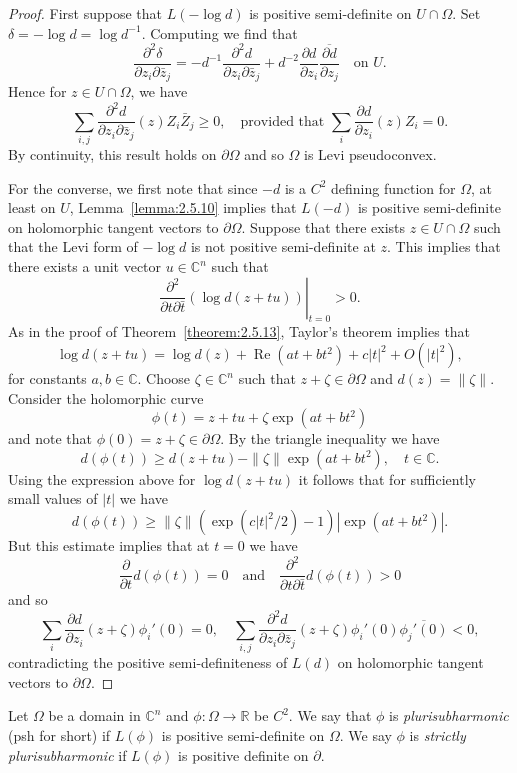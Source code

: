 \begin{proof}
First suppose that $L(-\log d)$ is positive semi-definite on $U\cap\Omega$. Set $\delta=-\log d=\log d^{-1}$. Computing we find that
\[\frac{\partial^2\delta}{\partial z_i\partial\bar z_j}=-d^{-1}\frac{\partial^2d}{\partial z_i\partial\bar z_j}+d^{-2}\frac{\partial d}{\partial z_i}\overline{\frac{\partial d}{\partial z_j}}\quad\text{on }U.\]
Hence for $z\in U\cap\Omega$, we have
\[\sum_{i,j}\frac{\partial^2d}{\partial z_i\partial\bar z_j}(z)Z_i\bar Z_j\geq0,\quad\text{provided that }\sum_i\frac{\partial d}{\partial z_i}(z)Z_i=0.\]
By continuity, this result holds on $\partial\Omega$ and so $\Omega$ is Levi pseudoconvex.

For the converse, we first note that since $-d$ is a $C^2$ defining function for $\Omega$, at least on $U$, Lemma~\ref{lemma:2.5.10} implies that $L(-d)$ is positive semi-definite on holomorphic tangent vectors to $\partial\Omega$. Suppose that there exists $z\in U\cap\Omega$ such that the Levi form of $-\log d$ is not positive semi-definite at $z$. This implies that there exists a unit vector $u\in\mathbb C^n$ such that
\[\left.\frac{\partial^2}{\partial t\partial\bar t}(\log d(z+tu))\right|_{t=0}>0.\]
As in the proof of Theorem~\ref{theorem:2.5.13}, Taylor's theorem implies that
\[\log d(z+tu)=\log d(z)+\operatorname{Re}(at+bt^2)+c|t|^2+O(|t|^2),\]
for constants $a,b\in\mathbb C$. Choose $\zeta\in\mathbb C^n$ such that $z+\zeta\in\partial\Omega$ and $d(z)=\|\zeta\|$. Consider the holomorphic curve
\[\phi(t)=z+tu+\zeta\exp(at+bt^2)\]
and note that $\phi(0)=z+\zeta\in\partial\Omega$. By the triangle inequality we have
\[d(\phi(t))\geq d(z+tu)-\|\zeta\|\exp(at+bt^2),\quad t\in\mathbb C.\]
Using the expression above for $\log d(z+tu)$ it follows that for sufficiently small values of $|t|$ we have
\[d(\phi(t))\geq\|\zeta\|(\exp(c|t|^2/2)-1)|\exp(at+bt^2)|.\]
But this estimate implies that at $t=0$ we have
\[\frac{\partial}{\partial t}d(\phi(t))=0\quad\text{and}\quad\frac{\partial^2}{\partial t\partial\bar t}d(\phi(t))>0\]
and so
\[\sum_i\frac{\partial d}{\partial z_i}(z+\zeta)\phi_i'(0)=0,\quad
\sum_{i,j}\frac{\partial^2d}{\partial z_i\partial\bar z_j}(z+\zeta)\phi_i'(0)\overline{\phi_j'(0)}<0,\]
contradicting the positive semi-definiteness of $L(d)$ on holomorphic tangent vectors to $\partial\Omega$.
\end{proof}
 Let $\Omega$ be a domain in $\mathbb C^n$ and $\phi:\Omega\to\mathbb R$ be $C^2$. We say that $\phi$ is \emph{plurisubharmonic} (psh for short) if $L(\phi)$ is positive semi-definite on $\Omega$. We say $\phi$ is \emph{strictly plurisubharmonic} if $L(\phi)$ is positive definite on $\partial$.
